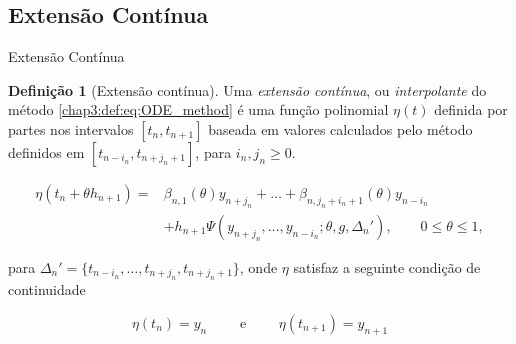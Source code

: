\documentclass{beamer}
\theoremstyle{plain}
\theoremstyle{definition}
\newtheorem{defi}{Definição}
\begin{document}
\subsection{Extensão Contínua}
\begin{frame}{Extensão Contínua}


    \small
    \begin{defi}[Extensão contínua]
        Uma \textit{extensão contínua}, ou \textit{interpolante} do método \eqref{chap3:def:eq:ODE_method} é uma função polinomial $\eta(t)$ definida por partes nos intervalos $[t_n, t_{n+1}]$ baseada em valores calculados pelo método definidos em $[t_{n - i_n}, t_{n+j_n + 1}]$, para $i_n, j_n \geq 0$. 

        \begin{equation}
            \begin{split}
                \eta(t_n + \theta h_{n+1}) = &\beta_{n, 1} (\theta) y_{n + j_n} + \dots + \beta_{n, j_n + i_n + 1}(\theta) y_{n - i_n} \\
                                             &+ h_{n+1} \Psi(y_{n+j_n}, \dots, y_{n-i_n}; \theta, g, \Delta _n '), \qquad 0 \leq \theta \leq 1,
                                             \label{chap3:def:eq:Interpolant_extension}
            \end{split}
        \end{equation}

        \noindent
        para $\Delta _n ' = \{ t_{n - i_n} , \dots, t_{n+j_n}, t_{n +j_n + 1} \}$, onde $\eta$ satisfaz a seguinte condição de continuidade

        \begin{equation}
            \eta(t_n) = y_n \qquad  \text{ e } \qquad \eta(t_{n+1}) = y_{n+1}
            \label{chap3:def:eq:continuity_condition}
        \end{equation}

    \end{defi}

\end{frame}
 

\end{document}
